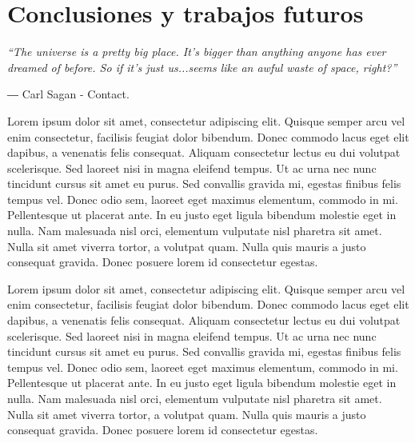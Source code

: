 \chapter{Conclusiones y trabajos futuros}

\hfill%
\begin{minipage}{0.7\textwidth}
	\begin{flushright}
		\emph{\enquote{The universe is a pretty big place. It’s bigger than anything anyone has ever dreamed of before. So if it’s just us...seems like an awful waste of space, right?}
			\vspace{5mm}}
		
		― Carl Sagan - Contact.
	\end{flushright}
\end{minipage}
\vspace{15mm}

Lorem ipsum dolor sit amet, consectetur adipiscing elit. Quisque semper arcu vel enim consectetur, facilisis feugiat dolor bibendum. Donec commodo lacus eget elit dapibus, a venenatis felis consequat. Aliquam consectetur lectus eu dui volutpat scelerisque. Sed laoreet nisi in magna eleifend tempus. Ut ac urna nec nunc tincidunt cursus sit amet eu purus. Sed convallis gravida mi, egestas finibus felis tempus vel. Donec odio sem, laoreet eget maximus elementum, commodo in mi. Pellentesque ut placerat ante. In eu justo eget ligula bibendum molestie eget in nulla. Nam malesuada nisl orci, elementum vulputate nisl pharetra sit amet. Nulla sit amet viverra tortor, a volutpat quam. Nulla quis mauris a justo consequat gravida. Donec posuere lorem id consectetur egestas.

Lorem ipsum dolor sit amet, consectetur adipiscing elit. Quisque semper arcu vel enim consectetur, facilisis feugiat dolor bibendum. Donec commodo lacus eget elit dapibus, a venenatis felis consequat. Aliquam consectetur lectus eu dui volutpat scelerisque. Sed laoreet nisi in magna eleifend tempus. Ut ac urna nec nunc tincidunt cursus sit amet eu purus. Sed convallis gravida mi, egestas finibus felis tempus vel. Donec odio sem, laoreet eget maximus elementum, commodo in mi. Pellentesque ut placerat ante. In eu justo eget ligula bibendum molestie eget in nulla. Nam malesuada nisl orci, elementum vulputate nisl pharetra sit amet. Nulla sit amet viverra tortor, a volutpat quam. Nulla quis mauris a justo consequat gravida. Donec posuere lorem id consectetur egestas.
